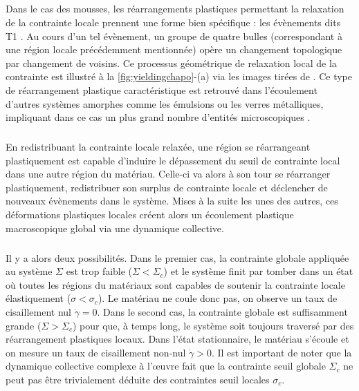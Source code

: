\subparagraph{}Dans le cas des mousses, les réarrangements plastiques permettant la relaxation de la contrainte locale prennent une forme bien spécifique : les évènements dits T1 \cite{princen_rheology_1986}. Au cours d'un tel évènement, un groupe de quatre bulles (correspondant à une région locale précédemment mentionnée) opère un changement topologique par changement de voisins. Ce processus géométrique de relaxation local de la contrainte est illustré à la \autoref{fig:yieldingchapo}-(a) via les images tirées de \cite{dollet_rheology_2014}. Ce type de réarrangement plastique caractéristique est retrouvé dans l'écoulement d'autres systèmes amorphes comme les émulsions ou les verres métalliques, impliquant dans ce cas un plus grand nombre d'entités microscopiques \cite{nicolas_deformation_2018}. 

\subparagraph{}En redistribuant la contrainte locale relaxée, une région se réarrangeant plastiquement est capable d'induire le dépassement du seuil de contrainte local dans une autre région du matériau. Celle-ci va alors à son tour se réarranger plastiquement, redistribuer son surplus de contrainte locale et déclencher de nouveaux évènements dans le système. Mises à la suite les unes des autres, ces déformations plastiques locales créent alors un écoulement plastique macroscopique global via une dynamique collective.

\subparagraph{}Il y a alors deux possibilités. Dans le premier cas, la contrainte globale appliquée au système $\Sigma$ est trop faible ($\Sigma<\Sigma_c$) et le système finit par tomber dans un état où toutes les régions du matériaux sont capables de soutenir la contrainte locale élastiquement ($\sigma < \sigma_c$). Le matériau ne coule donc pas, on observe un taux de cisaillement nul $\dot{\gamma} = 0$. Dans le second cas, la contrainte globale est suffisamment grande ($\Sigma>\Sigma_c$) pour que, à temps long, le système soit toujours traversé par des réarrangement plastiques locaux. Dans l'état stationnaire, le matériau s'écoule et on mesure un taux de cisaillement non-nul $\dot{\gamma}>0$. Il est important de noter que la dynamique collective complexe à l’œuvre fait que la contrainte seuil globale $\Sigma_c$ ne peut pas être trivialement déduite des contraintes seuil locales $\sigma_c$.

